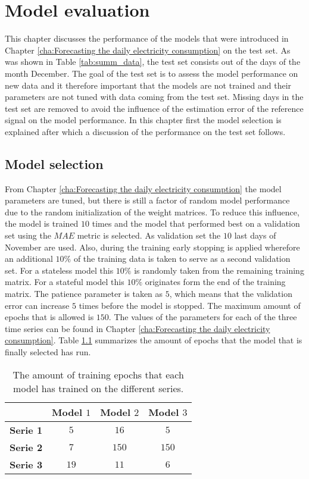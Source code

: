 \chapter{Model evaluation}
\label{cha:Model evaluation}

This chapter discusses the performance of the models that were introduced in Chapter \ref{cha:Forecasting the daily electricity consumption} on the test set. As was shown in Table \ref{tab:summ_data}, the test set consists out of the days of the month December. The goal of the test set is to assess the model performance on new data and it therefore important that the models are not trained and their parameters are not tuned with data coming from the test set. Missing days in the test set are removed to avoid the influence of the estimation error of the reference signal on the model performance. In this chapter first the model selection is explained after which a discussion of the performance on the test set follows.

\section{Model selection}\label{s:Model selection}
From Chapter \ref{cha:Forecasting the daily electricity consumption} the model parameters are tuned, but there is still a factor of random model performance due to the random initialization of the weight matrices. To reduce this influence, the model is trained $ 10 $ times and the model that performed best on a validation set using the $ MAE $ metric is selected. As validation set the $ 10 $ last days of November are used. Also, during the training early stopping is applied wherefore an additional $ 10\% $ of the training data is taken to serve as a second validation set. For a stateless model this $ 10\% $ is randomly taken from the remaining training matrix. For a stateful model this $ 10\% $ originates form the end of the training matrix. The patience parameter is taken as $ 5 $, which means that the validation error can increase $ 5 $ times before the model is stopped. The maximum amount of epochs that is allowed is $ 150 $. The values of the parameters for each of the three time series can be found in Chapter \ref{cha:Forecasting the daily electricity consumption}. Table \ref{tab:summ_model_selection} summarizes the amount of epochs that the model that is finally selected has run.

\begin{table}[h]
	\centering
	\begin{tabular}{@{}l|ccc@{}} \toprule
				         & \textbf{Model $ 1 $} & \textbf{Model $ 2 $} & \textbf{Model $ 3 $}\\\midrule
		\textbf{Serie 1} & $5 $&$ 16$  & $5 $\\
		\textbf{Serie 2} & $7 $&$ 150 $  & $150$\\
		\textbf{Serie 3} & $19 $&$ 11 $  & $6$\\\bottomrule
	\end{tabular}
	\caption{The amount of training epochs that each model has trained on the different series.}
	\label{tab:summ_model_selection}
\end{table}



